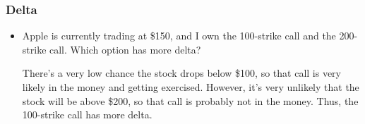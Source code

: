 \subsubsection{Delta}
\begin{example}
    \begin{itemize}
        \item Apple is currently trading at \$150, and I own the 100-strike call and the 200-strike call. Which option has more delta?

            \begin{solution}
                There's a very low chance the stock drops below \$100, so that call is very likely in the money and getting exercised. However, it's very unlikely that the stock will be above \$200, so that call is probably not in the money. Thus, the 100-strike call has more delta.
            \end{solution}
            
    \end{itemize}
\end{example}

